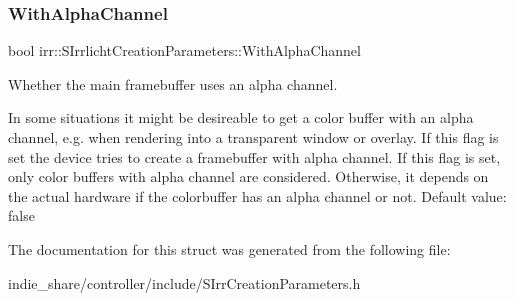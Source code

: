 \subsubsection{\texorpdfstring{With\+Alpha\+Channel}{WithAlphaChannel}}
{\footnotesize\ttfamily bool irr\+::\+S\+Irrlicht\+Creation\+Parameters\+::\+With\+Alpha\+Channel}



Whether the main framebuffer uses an alpha channel. 

In some situations it might be desireable to get a color buffer with an alpha channel, e.\+g. when rendering into a transparent window or overlay. If this flag is set the device tries to create a framebuffer with alpha channel. If this flag is set, only color buffers with alpha channel are considered. Otherwise, it depends on the actual hardware if the colorbuffer has an alpha channel or not. Default value\+: false 

The documentation for this struct was generated from the following file\+:\begin{DoxyCompactItemize}
\item 
indie\+\_\+share/controller/include/S\+Irr\+Creation\+Parameters.\+h\end{DoxyCompactItemize}
